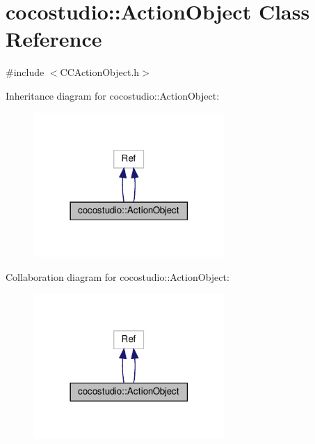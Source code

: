 \hypertarget{classcocostudio_1_1ActionObject}{}\section{cocostudio\+:\+:Action\+Object Class Reference}
\label{classcocostudio_1_1ActionObject}


{\ttfamily \#include $<$C\+C\+Action\+Object.\+h$>$}



Inheritance diagram for cocostudio\+:\+:Action\+Object\+:
\nopagebreak
\begin{figure}[H]
\begin{center}
\leavevmode
\includegraphics[width=206pt]{classcocostudio_1_1ActionObject__inherit__graph}
\end{center}
\end{figure}


Collaboration diagram for cocostudio\+:\+:Action\+Object\+:
\nopagebreak
\begin{figure}[H]
\begin{center}
\leavevmode
\includegraphics[width=206pt]{classcocostudio_1_1ActionObject__coll__graph}
\end{center}
\end{figure}

